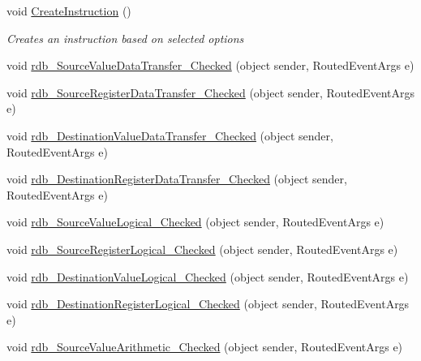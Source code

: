 \begin{DoxyCompactItemize}
void \hyperlink{class_c_p_u___o_s___simulator_1_1_instructions_window_aafdc8c843b7f2d0e4c434edc569923c6}{Create\+Instruction} ()
\begin{DoxyCompactList}\small\item\em Creates an instruction based on selected options \end{DoxyCompactList}\item 
void \hyperlink{class_c_p_u___o_s___simulator_1_1_instructions_window_adce5e32de39213723ea06d279681b8ea}{rdb\+\_\+\+Source\+Value\+Data\+Transfer\+\_\+\+Checked} (object sender, Routed\+Event\+Args e)
\item 
void \hyperlink{class_c_p_u___o_s___simulator_1_1_instructions_window_aec7d6be51c8cd95dce4db01a5c66047e}{rdb\+\_\+\+Source\+Register\+Data\+Transfer\+\_\+\+Checked} (object sender, Routed\+Event\+Args e)
\item 
void \hyperlink{class_c_p_u___o_s___simulator_1_1_instructions_window_a8572bfa72449f43f800dd55961ad7837}{rdb\+\_\+\+Destination\+Value\+Data\+Transfer\+\_\+\+Checked} (object sender, Routed\+Event\+Args e)
\item 
void \hyperlink{class_c_p_u___o_s___simulator_1_1_instructions_window_a61a12a00e2f822ca948b2216b5dd85db}{rdb\+\_\+\+Destination\+Register\+Data\+Transfer\+\_\+\+Checked} (object sender, Routed\+Event\+Args e)
\item 
void \hyperlink{class_c_p_u___o_s___simulator_1_1_instructions_window_ad1c6df35e2658c60a531a1f651f47434}{rdb\+\_\+\+Source\+Value\+Logical\+\_\+\+Checked} (object sender, Routed\+Event\+Args e)
\item 
void \hyperlink{class_c_p_u___o_s___simulator_1_1_instructions_window_af6e5871e2b68c4922775ea1f65309bac}{rdb\+\_\+\+Source\+Register\+Logical\+\_\+\+Checked} (object sender, Routed\+Event\+Args e)
\item 
void \hyperlink{class_c_p_u___o_s___simulator_1_1_instructions_window_ae4f933abbff92c008d38f9b3e9008315}{rdb\+\_\+\+Destination\+Value\+Logical\+\_\+\+Checked} (object sender, Routed\+Event\+Args e)
\item 
void \hyperlink{class_c_p_u___o_s___simulator_1_1_instructions_window_af0d373665806dc4e8798761c967ead81}{rdb\+\_\+\+Destination\+Register\+Logical\+\_\+\+Checked} (object sender, Routed\+Event\+Args e)
\item 
void \hyperlink{class_c_p_u___o_s___simulator_1_1_instructions_window_a8a693624b1b25769de9cccfaea819daf}{rdb\+\_\+\+Source\+Value\+Arithmetic\+\_\+\+Checked} (object sender, Routed\+Event\+Args e)
\item 

\end{DoxyCompactItemize}
